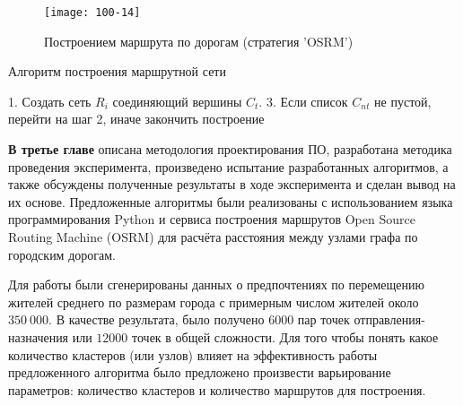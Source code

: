 \begin{figure}[ht!]
    \centering
    \texttt{[image: 100-14]}
    \caption{Построением маршрута по дорогам (стратегия 'OSRM')}
    \label{fig:osrm}
\end{figure}

\clearpage

\begin{algorithm}[ht!]
    \caption{Алгоритм построения маршрутной сети}
    1. Создать сеть \( R_i \) соединяющий вершины \( C_t \). 
    3. Если список \( C_{nt} \) не пустой, перейти на шаг 2, иначе закончить построение\;
    \label{alg:min-length}
\end{algorithm}

\textbf{В третье главе} описана методология проектирования ПО, разработана методика проведения эксперимента, 
произведено испытание разработанных алгоритмов, а также обсуждены полученные результаты в ходе эксперимента 
и сделан вывод на их основе. Предложенные алгоритмы были реализованы с использованием языка программирования 
Python и сервиса построения маршрутов Open Source Routing Machine (OSRM) для расчёта расстояния между узлами 
графа по городским дорогам.

Для работы были сгенерированы данных о предпочтениях по перемещению жителей среднего по размерам города с 
примерным числом жителей около \( 350\ 000 \). В качестве результата, было получено \( 6000 \) пар точек 
отправления-назначения или \( 12000 \) точек в общей сложности. Для того чтобы понять какое количество 
кластеров (или узлов) влияет на эффективность работы предложенного алгоритма было предложено произвести 
варьирование параметров: количество кластеров и количество маршрутов для построения.


